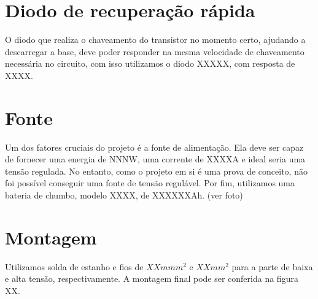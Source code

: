 \section{Diodo de recuperação rápida}
O diodo que realiza o chaveamento do transistor no momento certo, ajudando a descarregar a base, deve poder responder na mesma velocidade de chaveamento necessária no circuito, com isso utilizamos o diodo XXXXX, com resposta de XXXX.
\section{Fonte}
Um dos fatores cruciais do projeto é a fonte de alimentação. Ela deve ser capaz de fornecer uma energia de NNNW, uma corrente de XXXXA e ideal seria uma tensão regulada. No entanto, como o projeto em si é uma prova de conceito, não foi possível conseguir uma fonte de tensão regulável. Por fim, utilizamos uma bateria de chumbo, modelo XXXX, de XXXXXXAh. (ver foto)
\section{Montagem}
Utilizamos solda de estanho e fios de $XXmmm^2$ e $XXmm^2$ para a parte de baixa e alta tensão, respectivamente. A montagem final pode ser conferida na figura XX.